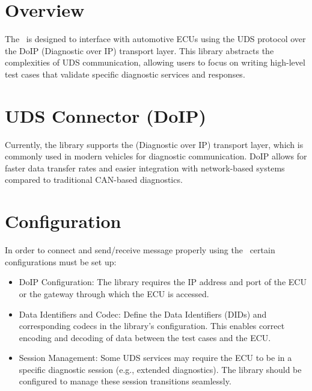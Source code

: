 




\section{Overview}
The \pkg\ is designed to interface with automotive ECUs using the UDS protocol 
over the DoIP (Diagnostic over IP) transport layer. 
This library abstracts the complexities of UDS communication, allowing users to 
focus on writing high-level test cases that validate specific diagnostic 
services and responses.

\section{UDS Connector (DoIP)}
Currently, the library supports the  (Diagnostic over IP) transport 
layer, which is commonly used in modern vehicles for diagnostic communication. 
DoIP allows for faster data transfer rates and easier integration with 
network-based systems compared to traditional CAN-based diagnostics.

\section{Configuration}
In order to connect and send/receive message properly using the \pkg\, 
certain configurations must be set up:

\begin{itemize}
   \item DoIP Configuration:
         The library requires the IP address and port of the ECU or the gateway 
         through which the ECU is accessed.
   \item Data Identifiers and Codec:
         Define the Data Identifiers (DIDs) and corresponding codecs in the 
         library’s configuration. 
         This enables correct encoding and decoding of data between the test 
         cases and the ECU.
   \item Session Management: 
         Some UDS services may require the ECU to be in a specific diagnostic 
         session (e.g., extended diagnostics). 
         The library should be configured to manage these session transitions 
         seamlessly.
\end{itemize}

